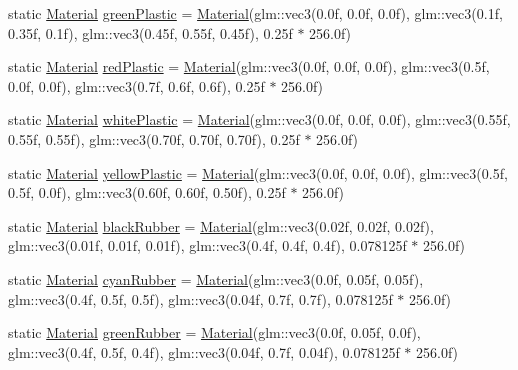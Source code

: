 \begin{DoxyCompactItemize}
\item 
static \mbox{\hyperlink{struct_material}{Material}} \mbox{\hyperlink{struct_material_abaddc1454d8d34f501be471246853856}{green\+Plastic}} = \mbox{\hyperlink{struct_material}{Material}}(glm\+::vec3(0.\+0f, 0.\+0f, 0.\+0f), glm\+::vec3(0.\+1f, 0.\+35f, 0.\+1f), glm\+::vec3(0.\+45f, 0.\+55f, 0.\+45f), 0.\+25f $\ast$ 256.\+0f)
\item 
static \mbox{\hyperlink{struct_material}{Material}} \mbox{\hyperlink{struct_material_a343f9c5d998f1db5ba50ef40376b09fe}{red\+Plastic}} = \mbox{\hyperlink{struct_material}{Material}}(glm\+::vec3(0.\+0f, 0.\+0f, 0.\+0f), glm\+::vec3(0.\+5f, 0.\+0f, 0.\+0f), glm\+::vec3(0.\+7f, 0.\+6f, 0.\+6f), 0.\+25f $\ast$ 256.\+0f)
\item 
static \mbox{\hyperlink{struct_material}{Material}} \mbox{\hyperlink{struct_material_ac7c32558480485c95f64558f7732f325}{white\+Plastic}} = \mbox{\hyperlink{struct_material}{Material}}(glm\+::vec3(0.\+0f, 0.\+0f, 0.\+0f), glm\+::vec3(0.\+55f, 0.\+55f, 0.\+55f), glm\+::vec3(0.\+70f, 0.\+70f, 0.\+70f), 0.\+25f $\ast$ 256.\+0f)
\item 
static \mbox{\hyperlink{struct_material}{Material}} \mbox{\hyperlink{struct_material_a9312d192d0bee2cbcf1e2d1d6f2d9a9e}{yellow\+Plastic}} = \mbox{\hyperlink{struct_material}{Material}}(glm\+::vec3(0.\+0f, 0.\+0f, 0.\+0f), glm\+::vec3(0.\+5f, 0.\+5f, 0.\+0f), glm\+::vec3(0.\+60f, 0.\+60f, 0.\+50f), 0.\+25f $\ast$ 256.\+0f)
\item 
static \mbox{\hyperlink{struct_material}{Material}} \mbox{\hyperlink{struct_material_a0772c33ab6f82b876232153661a64c76}{black\+Rubber}} = \mbox{\hyperlink{struct_material}{Material}}(glm\+::vec3(0.\+02f, 0.\+02f, 0.\+02f), glm\+::vec3(0.\+01f, 0.\+01f, 0.\+01f), glm\+::vec3(0.\+4f, 0.\+4f, 0.\+4f), 0.\+078125f $\ast$ 256.\+0f)
\item 
static \mbox{\hyperlink{struct_material}{Material}} \mbox{\hyperlink{struct_material_a75c93c67433d5aafd1ed76aef97950a2}{cyan\+Rubber}} = \mbox{\hyperlink{struct_material}{Material}}(glm\+::vec3(0.\+0f, 0.\+05f, 0.\+05f), glm\+::vec3(0.\+4f, 0.\+5f, 0.\+5f), glm\+::vec3(0.\+04f, 0.\+7f, 0.\+7f), 0.\+078125f $\ast$ 256.\+0f)
\item 
static \mbox{\hyperlink{struct_material}{Material}} \mbox{\hyperlink{struct_material_aab6e7659ecff08471027e084046cafe4}{green\+Rubber}} = \mbox{\hyperlink{struct_material}{Material}}(glm\+::vec3(0.\+0f, 0.\+05f, 0.\+0f), glm\+::vec3(0.\+4f, 0.\+5f, 0.\+4f), glm\+::vec3(0.\+04f, 0.\+7f, 0.\+04f), 0.\+078125f $\ast$ 256.\+0f)

\end{DoxyCompactItemize}

